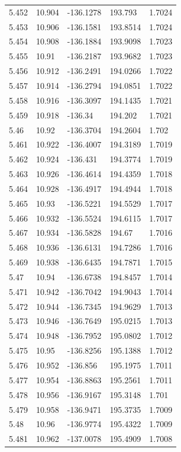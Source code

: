 \begin{tabular}{lllll}
5.452 & 10.904 & -136.1278 & 193.793 & 1.7024 \\
5.453 & 10.906 & -136.1581 & 193.8514 & 1.7024 \\
5.454 & 10.908 & -136.1884 & 193.9098 & 1.7023 \\
5.455 & 10.91 & -136.2187 & 193.9682 & 1.7023 \\
5.456 & 10.912 & -136.2491 & 194.0266 & 1.7022 \\
5.457 & 10.914 & -136.2794 & 194.0851 & 1.7022 \\
5.458 & 10.916 & -136.3097 & 194.1435 & 1.7021 \\
5.459 & 10.918 & -136.34 & 194.202 & 1.7021 \\
5.46 & 10.92 & -136.3704 & 194.2604 & 1.702 \\
5.461 & 10.922 & -136.4007 & 194.3189 & 1.7019 \\
5.462 & 10.924 & -136.431 & 194.3774 & 1.7019 \\
5.463 & 10.926 & -136.4614 & 194.4359 & 1.7018 \\
5.464 & 10.928 & -136.4917 & 194.4944 & 1.7018 \\
5.465 & 10.93 & -136.5221 & 194.5529 & 1.7017 \\
5.466 & 10.932 & -136.5524 & 194.6115 & 1.7017 \\
5.467 & 10.934 & -136.5828 & 194.67 & 1.7016 \\
5.468 & 10.936 & -136.6131 & 194.7286 & 1.7016 \\
5.469 & 10.938 & -136.6435 & 194.7871 & 1.7015 \\
5.47 & 10.94 & -136.6738 & 194.8457 & 1.7014 \\
5.471 & 10.942 & -136.7042 & 194.9043 & 1.7014 \\
5.472 & 10.944 & -136.7345 & 194.9629 & 1.7013 \\
5.473 & 10.946 & -136.7649 & 195.0215 & 1.7013 \\
5.474 & 10.948 & -136.7952 & 195.0802 & 1.7012 \\
5.475 & 10.95 & -136.8256 & 195.1388 & 1.7012 \\
5.476 & 10.952 & -136.856 & 195.1975 & 1.7011 \\
5.477 & 10.954 & -136.8863 & 195.2561 & 1.7011 \\
5.478 & 10.956 & -136.9167 & 195.3148 & 1.701 \\
5.479 & 10.958 & -136.9471 & 195.3735 & 1.7009 \\
5.48 & 10.96 & -136.9774 & 195.4322 & 1.7009 \\
5.481 & 10.962 & -137.0078 & 195.4909 & 1.7008 \\

\end{tabular}
